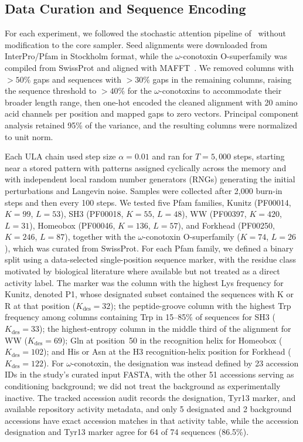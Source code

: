 \subsection{Data Curation and Sequence Encoding}

For each experiment, we followed the stochastic attention pipeline
of~\cite{varnerSAProtein2026} without modification to the core sampler. Seed alignments were
downloaded from InterPro/Pfam in Stockholm format, while the $\omega$-conotoxin O-superfamily
was compiled from SwissProt and aligned with MAFFT~\cite{mafft2013}. We removed columns with
$>50\%$ gaps and sequences with $>30\%$ gaps in the remaining columns, raising the sequence
threshold to $>40\%$ for the $\omega$-conotoxins to accommodate their broader length range, then one-hot encoded the
cleaned alignment with 20 amino acid channels per position and mapped gaps to zero vectors.
Principal component analysis retained 95\% of the variance, and the resulting columns were
normalized to unit norm.

Each ULA chain used step size $\alpha=0.01$ and ran for $T=5{,}000$ steps, starting near a
stored pattern with patterns assigned cyclically across the memory and with independent local
random number generators (RNGs) generating the initial perturbations and Langevin noise. Samples were collected after
2{,}000 burn-in steps and then every 100 steps. We tested five Pfam families, Kunitz
(PF00014, $K=99$, $L=53$), SH3 (PF00018, $K=55$, $L=48$), WW (PF00397, $K=420$, $L=31$),
Homeobox (PF00046, $K=136$, $L=57$), and Forkhead (PF00250, $K=246$, $L=87$), together with
the $\omega$-conotoxin O-superfamily ($K=74$, $L=26$), which was curated from
SwissProt. For each Pfam family, we defined a binary split using a data-selected
single-position sequence marker, with the residue class motivated by biological literature
where available but not treated as a direct activity label. The marker was the column with the
highest Lys frequency for Kunitz, denoted P1, whose designated subset contained the sequences
with K or R at that position ($K_{\mathrm{des}}=32$); the peptide-groove column with the
highest Trp frequency among
columns containing Trp in 15--85\% of sequences for SH3 ($K_{\mathrm{des}}=33$); the
highest-entropy column in the middle third of the alignment for WW ($K_{\mathrm{des}}=69$);
Gln at position~50 in the recognition helix for Homeobox ($K_{\mathrm{des}}=102$); and His or
Asn at the H3 recognition-helix position for Forkhead ($K_{\mathrm{des}}=122$). For
$\omega$-conotoxin, the designation was instead defined by 23 accession IDs in the study's
curated input FASTA, with the other 51 accessions serving as conditioning background; we did
not treat the background as experimentally inactive. The tracked accession audit records the
designation, Tyr13
marker, and available repository activity metadata, and only 5 designated and 2 background
accessions have exact accession matches in that activity table, while the accession designation
and Tyr13 marker agree for 64 of 74 sequences (86.5\%).

